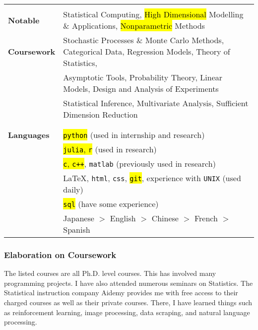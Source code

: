 \documentclass[utf8,letterpaper,oneside]{article}
\begin{document}
\begin{center}
\begin{tabular}{l l}
                           &                                                                                                               \\
  \textbf{Notable}         & Statistical Computing, \hl{High Dimensional} Modelling \& Applications, \hl{Nonparametric} Methods            \\
  \textbf{Coursework}      & Stochastic Processes \& Monte Carlo Methods, Categorical Data, Regression Models, Theory of Statistics,       \\
                           & Asymptotic Tools, Probability Theory, Linear Models, Design and Analysis of Experiments                       \\
                           & Statistical Inference, Multivariate Analysis, Sufficient Dimension Reduction                                  \\
                           &                                                                                                               \\ \hline
                           &                                                                                                               \\
  \textbf{Languages}       & \hl{\texttt{python}} (used in internship and research)                                                        \\
                           & \hl{\texttt{julia}, \texttt{r}} (used in research)                                                            \\
                           & \hl{\texttt{c}, \texttt{c++}}, \texttt{matlab} (previously used in research)                                  \\
                           & \LaTeX, \texttt{html}, \texttt{css}, \hl{\texttt{git}}, experience with \texttt{UNIX} (used daily)            \\
                           & \hl{\texttt{sql}} (have some experience)                                                                      \\
                           & Japanese $>$ English $>$ Chinese $>$ French $>$ Spanish                                                       \\
 \end{tabular}
\end{center}
\newpage
\large
\subsubsection*{Elaboration on Coursework}
The listed courses are all Ph.D. level courses. This has involved many programming projects. I have also attended numerous seminars on Statistics. The Statistical instruction company Aidemy provides me with free access to their charged courses as well as their private courses. There, I have learned things such as reinforcement learning, image processing, data scraping, and natural language processing.
\end{document}
